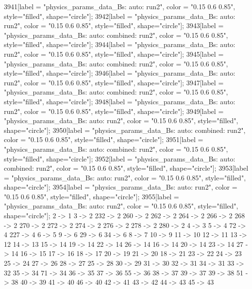 {	3941[label = "physics_params_data_Bs\nfit: auto\nyear: run2", color = "0.15 0.6 0.85", style="filled", shape="circle"];
	3942[label = "physics_params_data_Bs\nfit: auto\nyear: run2", color = "0.15 0.6 0.85", style="filled", shape="circle"];
	3943[label = "physics_params_data_Bs\nfit: auto\ntrigger: combined\nyear: run2", color = "0.15 0.6 0.85", style="filled", shape="circle"];
	3944[label = "physics_params_data_Bs\nfit: auto\nyear: run2", color = "0.15 0.6 0.85", style="filled", shape="circle"];
	3945[label = "physics_params_data_Bs\nfit: auto\ntrigger: combined\nyear: run2", color = "0.15 0.6 0.85", style="filled", shape="circle"];
	3946[label = "physics_params_data_Bs\nfit: auto\nyear: run2", color = "0.15 0.6 0.85", style="filled", shape="circle"];
	3947[label = "physics_params_data_Bs\nfit: auto\ntrigger: combined\nyear: run2", color = "0.15 0.6 0.85", style="filled", shape="circle"];
	3948[label = "physics_params_data_Bs\nfit: auto\nyear: run2", color = "0.15 0.6 0.85", style="filled", shape="circle"];
	3949[label = "physics_params_data_Bs\nfit: auto\nyear: run2", color = "0.15 0.6 0.85", style="filled", shape="circle"];
	3950[label = "physics_params_data_Bs\nfit: auto\ntrigger: combined\nyear: run2", color = "0.15 0.6 0.85", style="filled", shape="circle"];
	3951[label = "physics_params_data_Bs\nfit: auto\ntrigger: combined\nyear: run2", color = "0.15 0.6 0.85", style="filled", shape="circle"];
	3952[label = "physics_params_data_Bs\nfit: auto\ntrigger: combined\nyear: run2", color = "0.15 0.6 0.85", style="filled", shape="circle"];
	3953[label = "physics_params_data_Bs\nfit: auto\nyear: run2", color = "0.15 0.6 0.85", style="filled", shape="circle"];
	3954[label = "physics_params_data_Bs\nfit: auto\nyear: run2", color = "0.15 0.6 0.85", style="filled", shape="circle"];
	3955[label = "physics_params_data_Bs\nfit: auto\nyear: run2", color = "0.15 0.6 0.85", style="filled", shape="circle"];
	2 -> 1
	3 -> 2
	232 -> 2
	260 -> 2
	262 -> 2
	264 -> 2
	266 -> 2
	268 -> 2
	270 -> 2
	272 -> 2
	274 -> 2
	276 -> 2
	278 -> 2
	280 -> 2
	4 -> 3
	5 -> 4
	72 -> 4
	227 -> 4
	6 -> 5
	9 -> 6
	29 -> 6
	34 -> 6
	8 -> 7
	10 -> 9
	11 -> 10
	12 -> 11
	13 -> 12
	14 -> 13
	15 -> 14
	19 -> 14
	22 -> 14
	26 -> 14
	16 -> 14
	20 -> 14
	23 -> 14
	27 -> 14
	16 -> 15
	17 -> 16
	18 -> 17
	20 -> 19
	21 -> 20
	18 -> 21
	23 -> 22
	24 -> 23
	25 -> 24
	27 -> 26
	28 -> 27
	25 -> 28
	30 -> 29
	31 -> 30
	32 -> 31
	34 -> 31
	33 -> 32
	35 -> 34
	71 -> 34
	36 -> 35
	37 -> 36
	55 -> 36
	38 -> 37
	39 -> 37
	39 -> 38
	51 -> 38
	40 -> 39
	41 -> 40
	46 -> 40
	42 -> 41
	43 -> 42
	44 -> 43
	45 -> 43
}
